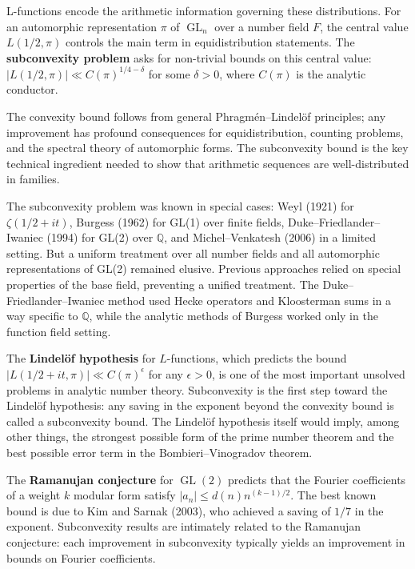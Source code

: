 L-functions encode the arithmetic information governing these distributions. For an automorphic representation $\pi$ of $\operatorname{GL}_n$ over a number field $F$, the central value $L(1/2, \pi)$ controls the main term in equidistribution statements. The \textbf{subconvexity problem} asks for non-trivial bounds on this central value: $|L(1/2, \pi)| \ll C(\pi)^{1/4 - \delta}$ for some $\delta > 0$, where $C(\pi)$ is the analytic conductor.

The convexity bound follows from general Phragm\'en--Lindel\"of principles; any improvement has profound consequences for equidistribution, counting problems, and the spectral theory of automorphic forms. The subconvexity bound is the key technical ingredient needed to show that arithmetic sequences are well-distributed in families.

The subconvexity problem was known in special cases: Weyl (1921) for $\zeta(1/2+it)$, Burgess (1962) for GL(1) over finite fields, Duke--Friedlander--Iwaniec (1994) for GL(2) over $\mathbb{Q}$, and Michel--Venkatesh (2006) in a limited setting. But a uniform treatment over all number fields and all automorphic representations of GL(2) remained elusive. Previous approaches relied on special properties of the base field, preventing a unified treatment. The Duke--Friedlander--Iwaniec method used Hecke operators and Kloosterman sums in a way specific to $\mathbb{Q}$, while the analytic methods of Burgess worked only in the function field setting.

The \textbf{Lindel\"of hypothesis} for $L$-functions, which predicts the bound $|L(1/2+it, \pi)| \ll C(\pi)^\epsilon$ for any $\epsilon > 0$, is one of the most important unsolved problems in analytic number theory. Subconvexity is the first step toward the Lindel\"of hypothesis: any saving in the exponent beyond the convexity bound is called a subconvexity bound. The Lindel\"of hypothesis itself would imply, among other things, the strongest possible form of the prime number theorem and the best possible error term in the Bombieri--Vinogradov theorem.

The \textbf{Ramanujan conjecture} for $\operatorname{GL}(2)$ predicts that the Fourier coefficients of a weight $k$ modular form satisfy $|a_n| \le d(n) n^{(k-1)/2}$. The best known bound is due to Kim and Sarnak (2003), who achieved a saving of $1/7$ in the exponent. Subconvexity results are intimately related to the Ramanujan conjecture: each improvement in subconvexity typically yields an improvement in bounds on Fourier coefficients.

